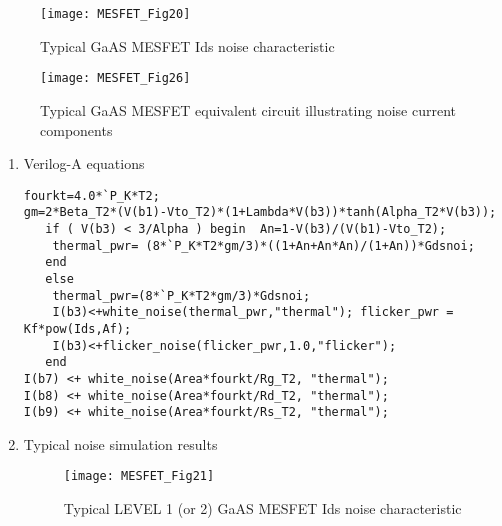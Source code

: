 \begin{figure} 
  \centering
  \texttt{[image: MESFET\_Fig20]}  
  \caption{Typical GaAS MESFET Ids noise characteristic} 
  \label{fig:fig20} 
\end{figure} 


\begin{figure} [h]
  \centering
  \texttt{[image: MESFET\_Fig26]}  
  \caption{Typical GaAS MESFET equivalent circuit illustrating noise current components} 
  \label{fig:fig26} 
\end{figure} 

\begin{enumerate}
 \item Verilog-A equations
\begin{verbatim}
fourkt=4.0*`P_K*T2;
gm=2*Beta_T2*(V(b1)-Vto_T2)*(1+Lambda*V(b3))*tanh(Alpha_T2*V(b3));
   if ( V(b3) < 3/Alpha ) begin  An=1-V(b3)/(V(b1)-Vto_T2);
    thermal_pwr= (8*`P_K*T2*gm/3)*((1+An+An*An)/(1+An))*Gdsnoi;
   end
   else
    thermal_pwr=(8*`P_K*T2*gm/3)*Gdsnoi; 
    I(b3)<+white_noise(thermal_pwr,"thermal"); flicker_pwr = Kf*pow(Ids,Af); 
    I(b3)<+flicker_noise(flicker_pwr,1.0,"flicker");
   end
I(b7) <+ white_noise(Area*fourkt/Rg_T2, "thermal");
I(b8) <+ white_noise(Area*fourkt/Rd_T2, "thermal");
I(b9) <+ white_noise(Area*fourkt/Rs_T2, "thermal");
\end{verbatim} 

\item Typical noise simulation results
\begin{figure} [h]
  \centering
  \texttt{[image: MESFET\_Fig21]}  
  \caption{Typical LEVEL 1 (or 2) GaAS MESFET Ids noise characteristic} 
  \label{fig:fig21} 
\end{figure} 

\end{enumerate}

